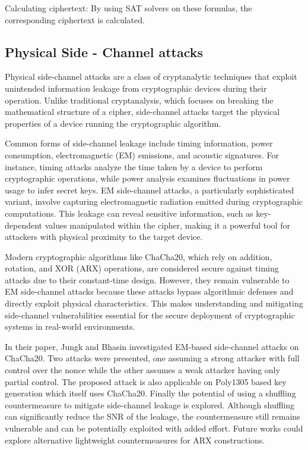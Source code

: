 \documentclass[a4paper,12pt]{report}
\begin{document}
Calculating ciphertext: By using SAT solvers on these formulas, the corresponding ciphertext is calculated.

\subsection{Physical Side - Channel attacks}
Physical side-channel attacks are a class of cryptanalytic techniques that exploit unintended information leakage from cryptographic devices during their operation.
Unlike traditional cryptanalysis, which focuses on breaking the mathematical structure of a cipher, side-channel attacks target the physical properties of a device running the cryptographic algorithm.

Common forms of side-channel leakage include timing information, power consumption, electromagnetic (EM) emissions, and acoustic signatures.
For instance, timing attacks analyze the time taken by a device to perform cryptographic operations, while power analysis examines fluctuations in power usage to infer secret keys.
EM side-channel attacks, a particularly sophisticated variant, involve capturing electromagnetic radiation emitted during cryptographic computations.
This leakage can reveal sensitive information, such as key-dependent values manipulated within the cipher, making it a powerful tool for attackers with physical proximity to the target device.

Modern cryptographic algorithms like ChaCha20, which rely on addition, rotation, and XOR (ARX) operations, are considered secure against timing attacks due to their constant-time design.
However, they remain vulnerable to EM side-channel attacks because these attacks bypass algorithmic defenses and directly exploit physical characteristics.
This makes understanding and mitigating side-channel vulnerabilities essential for the secure deployment of cryptographic systems in real-world environments.

In their paper, Jungk and Bhasin \cite{jungk2017don}
investigated EM-based side-channel attacks on ChaCha20.
Two attacks were presented, one assuming a strong attacker
with full control over the nonce while the other assumes
a weak attacker having only partial control. The proposed
attack is also applicable on Poly1305 based key generation
which itself uses ChaCha20. Finally the potential of using a
shuffling countermeasure to mitigate side-channel leakage is
explored. Although shuffling can significantly reduce the SNR
of the leakage, the countermeasure still remains vulnerable and
can be potentially exploited with added effort. Future works
could explore alternative lightweight countermeasures for ARX
constructions.
\end{document}

